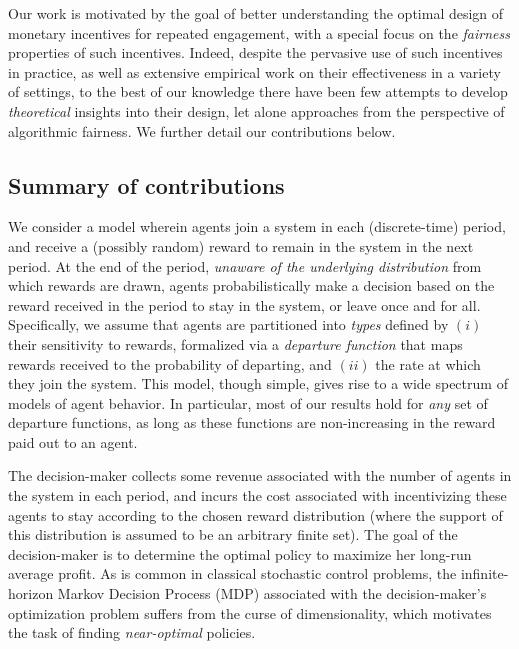 \documentclass[12pt]{article}
\begin{document}
Our work is motivated by the goal of better understanding the optimal design of monetary incentives for repeated engagement, with a special focus on the {\it fairness} properties of such incentives. Indeed, despite the pervasive use of such incentives in practice, as well as extensive empirical work on their effectiveness in a variety of settings, to the best of our knowledge there have been few attempts to develop {\it theoretical} insights into their design, let alone approaches from the perspective of algorithmic fairness. We further detail our contributions below.



\subsection{Summary of contributions}

We consider a model wherein agents join a system in each (discrete-time) period, and receive a (possibly random) reward to remain in the system in the next period. At the end of the period, {\it unaware of the underlying distribution} from which rewards are drawn, agents probabilistically make {a} decision based on the reward received in the period to stay in the system, or leave once and for all. Specifically, we assume that agents are partitioned into {\it types} defined by $(i)$ their sensitivity to rewards, formalized via a {\it departure function} {that maps rewards received to the probability of departing}, and $(ii)$ the rate at which they join the system. This model, though simple, gives rise to a wide spectrum of models of agent behavior. In particular, most of our results hold for {\it any} set of departure functions, as long as these  functions are non-increasing in the reward paid out to an agent.

The decision-maker collects some revenue associated with the number of agents in the system in each period, and incurs the cost associated with incentivizing these agents to stay according to the chosen reward distribution (where the support of this distribution is assumed to be {an arbitrary finite} set). The goal of the decision-maker is to determine the optimal policy to maximize her long-run average profit. As is common in classical stochastic control problems, the infinite-horizon Markov Decision Process (MDP) associated with the decision-maker's optimization problem suffers from the {curse of dimensionality}, which motivates the task of finding {\it near-optimal} policies.
\end{document}
